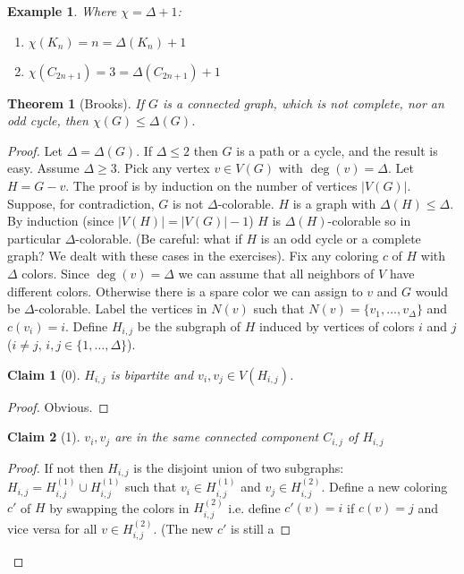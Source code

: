 \documentclass[a4paper]{article}
\theoremstyle{plain}
\newtheorem{theorem}[lemma]{Theorem}
\newtheorem*{claim}{Claim}
\theoremstyle{myremark}
\newtheorem{example}[lemma]{Example}
\begin{document}
\begin{example}
Where $\chi = \Delta + 1$:
\begin{enumerate}[(1)]
\item $\chi(K_n) = n = \Delta(K_n) + 1$
\item $\chi(C_{2n + 1}) = 3 = \Delta(C_{2n+1}) + 1$
\end{enumerate}
\end{example}

\begin{theorem}[Brooks]
If $G$ is a connected graph, which is not complete, nor an odd cycle,
then $\chi(G) \le \Delta(G)$.
\end{theorem}
\begin{proof}
Let $\Delta = \Delta(G)$. If $\Delta \le 2$ then $G$ is a path or a
cycle, and the result is easy. Assume $\Delta \ge 3$. Pick any vertex $v
\in V(G)$ with $\deg(v) = \Delta$. Let $H = G-v$.  The proof is by
induction on the number of vertices $|V(G)|$. Suppose, for
contradiction, $G$ is not $\Delta$-colorable. $H$ is a graph with
$\Delta(H) \le \Delta$. By induction (since $|V(H)| = |V(G)| - 1$) $H$
is $\Delta(H)$-colorable so in particular $\Delta$-colorable. (Be
careful: what if $H$ is an odd cycle or a complete graph? We dealt with these cases in the exercises). Fix any
coloring $c$ of $H$ with $\Delta$ colors. Since $\deg(v) = \Delta$ we can
assume that all neighbors of $V$ have different colors. Otherwise there is a
spare color we can assign to $v$ and $G$ would be $\Delta$-colorable.
Label the vertices in $N(v)$ such that $N(v) =
\{v_1,\ldots,v_{\Delta}\}$ and $c(v_i) = i$. Define $H_{i,j}$ be the
subgraph of $H$ induced by vertices of colors $i$ and $j$ ($i \neq j$,
$i,j \in \{1,\ldots,\Delta\}$).
\begin{claim}[0]
$H_{i,j}$ is bipartite and $v_i,v_j \in V(H_{i,j})$.
\end{claim}
\begin{proof}
Obvious.
\end{proof}
\begin{claim}[1]
$v_i,v_j$ are in the same connected component $C_{i,j}$ of $H_{i,j}$
\end{claim}
\begin{proof}
If not then $H_{i,j}$ is the disjoint union of two subgraphs: $H_{i,j} =
H_{i,j}^{(1)} \cup H_{i,j}^{(1)}$ such that $v_i \in
H_{i,j}^{(1)}$ and $v_j \in H_{i,j}^{(2)}$. Define a new coloring $c'$ of $H$
by swapping the colors in $H_{i,j}^{(2)}$ i.e. define $c'(v) = i$ if $c(v) = j$
and vice versa for all $v \in H_{i,j}^{(2)}$. (The new $c'$ is still a

\end{proof}
\end{proof}
\end{document}
